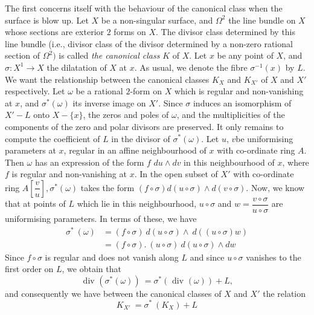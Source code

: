 The first concerns itself with the behaviour of the canonical class
when the surface is blow up. Let $X$ be a non-singular surface, and
$\Omega^2$ the line bundle on $X$ whose sections are exterior $2$
forms on $X$. The divisor class determined by this line bundle (i.e.,
divisor class of the divisor determined by a non-zero rational section
of $\Omega^2)$ is called \textit{the canonical class} $K$ of $X$. Let
$x$ be any point of $X$, and $\sigma : X^1 \to X$ the dilatation of
$X$ at $x$. As usual, we denote the fibre $\sigma^{-1} (x)$ by $L$. We
want the relationship between the canonical classes $K_X$ and $K_{X'}$
of $X$ and $X'$ respectively. Let $\omega$ be a rational $2$-form on
$X$ which is regular and non-vanishing at $x$, and $\sigma^* (\omega)$
its inverse image on $X'$. Since $\sigma$ induces an isomorphism of
$X'-L$ onto $X-\{x \}$, the zeros and poles of $\omega$, and the
multiplicities of the components of the zero and polar divisors are
preserved. It only remains to compute the coefficient of $L$ in the
divisor of $\sigma^* (\omega)$. Let $u$, $v$\pageoriginale be
uniformising parameters 
at $x$, regular in an affine neighbourhood of $x$ with co-ordinate
ring $A$. Then $\omega$ has an expression of the form $f$ $du \wedge
dv$ in this neighbourhood of $x$, where $f$ is regular and
non-vanishing at $x$. In the open subset of $X'$ with co-ordinate ring
$A [\dfrac{v}{u}], \sigma^*(\omega)$ takes the form $(f \circ \sigma) d(u \circ
\sigma) \wedge d(v \circ \sigma)$. Now, we know that at points of $L$
which lie in this neighbourhood, $u \circ \sigma$ and $w=\dfrac{v \circ
  \sigma}{u \circ \sigma}$ are uniformising parameters. In terms of these,
we have 
\begin{align*}
  \sigma^* ~ (\omega) &= (f \circ \sigma) ~ d(u \circ \sigma) \wedge ~
  d((u \circ
  \sigma) w )\\ 
  & = (f \circ \sigma). ~ (u \circ \sigma) ~ d(u \circ \sigma) \wedge d w
\end{align*}
Since $f \circ \sigma$ is regular and does not vanish along $L$ and since
$u \circ \sigma$ vanishes to the first order on $L$, we obtain that 
$$
\text{ div } (\sigma^*(\omega))  ~ = \sigma^* (\text { div } (\omega))
+ L, 
$$
and consequently we have between the canonical classes of $X$ and $X'$
the relation 
\begin{equation*}
  K_{X'} ~ = \sigma^* ~ (K_X) + L\tag{1}\label{chap7:eq1}
\end{equation*}

